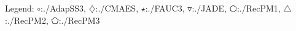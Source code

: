 Legend: {\color{NavyBlue}$\circ$}:./AdapSS3, {\color{Magenta}$\diamondsuit$}:./CMAES, {\color{Orange}$\star$}:./FAUC3, {\color{CornflowerBlue}$\triangledown$}:./JADE, {\color{red}$\varhexagon$}:./RecPM1, {\color{YellowGreen}$\triangle$}:./RecPM2, {\color{cyan}$\pentagon$}:./RecPM3